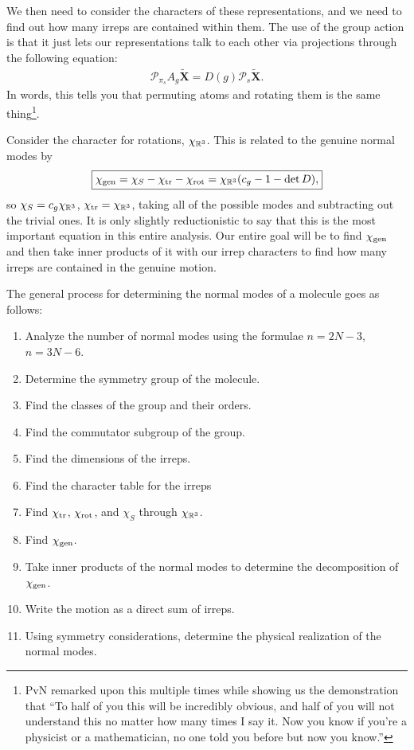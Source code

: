 \documentclass[11pt]{article}
\begin{document}
We then need to consider the characters of these representations,
and we need to find out how many irreps are contained within them.
The use of the group action is that it just lets our representations 
talk to each other via projections through the following equation:
\begin{align*}
    \boxed{\mathcal{P}_{\pi_s} A_g \widetilde{\mathbf{X}} = D(g) \mathcal{P}_s \widetilde{\mathbf{X}}.}
\end{align*}
In words, this tells you that permuting atoms and rotating them
is the same thing\footnote{PvN remarked upon this multiple times
while showing us the demonstration that ``To half of you this will
be incredibly obvious, and half of you will not understand
this no matter how many times I say it. Now you know if you're
a physicist or a mathematician, no one told you before but now you know.''
}.

Consider the character for rotations, $\chi_{\mathbb{R}^3}$. This is related
to the genuine normal modes by
\begin{align*}
    \boxed{\chi_{\rm gen} = \chi_S - \chi_{\rm tr} - \chi_{\rm rot} = \chi_{\mathbb{R}^3} (c_g - 1 - \operatorname{det}{D}),}
\end{align*}
so $\chi_S = c_g \chi_{\mathbb{R}^3}$, $\chi_{\rm tr} = \chi_{\mathbb{R}^3}$,
taking all of the possible modes and subtracting out the trivial ones.
It is only slightly reductionistic to say that this is the most important equation
in this entire analysis. Our entire goal will be to find $\chi_{\rm gen}$
and then take inner products of it with our irrep characters to find how 
many irreps are contained in the genuine motion.


The general process for determining the normal modes of a molecule
goes as follows:
\begin{enumerate}
    \item Analyze the number of normal modes using the formulae
    $n = 2N - 3$, $n = 3N - 6$. 
    \item Determine the symmetry group of the molecule.
    \item Find the classes of the group and their orders.
    \item Find the commutator subgroup of the group.
    \item Find the dimensions of the irreps.
    \item Find the character table for the irreps
    \item Find $\chi_{\rm tr}$, $\chi_{\rm rot}$, and $\chi_S$
    through $\chi_{\mathbb{R}^3}$.
    \item Find $\chi_{\rm gen}$.
    \item Take inner products of the normal modes to determine
    the decomposition of $\chi_{\rm gen}$.
    \item Write the motion as a direct sum of irreps.
    \item Using symmetry considerations, determine the
    physical realization of the normal modes.
\end{enumerate}
\end{document}
